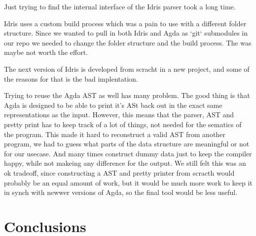 \documentclass[parskip=half]{scrartcl}
\begin{document}
Just trying to find the internal interface of the Idris parser took a long
time.

Idris uses a custom build process which was a pain to use with a different
folder structure. Since we wanted to pull in both Idris and Agda as `git`
submodules in our repo we needed to change the folder structure and the build
process. The was maybe not worth the effort.

The next version of Idris is developed from scracht in a new project, and some
of the reasons for that is the bad implentation. %

Trying to reuse the Agda AST as well has many problem. The good thing is that
Agda is designed to be able to print it's ASt back out in the exact same
representations as the input. However, this means that the parser, AST and
pretty print has to keep track of a lot of things, not needed for the sematics
of the program. This made it hard to reconstruct a valid AST from another
program, we had to guess what parts of the data structure are meaningful or not
for our usecase. And many times construct dummy data just to keep the compiler
happy, while not makeing any difference for the output. We still felt this was
an ok tradeoff, since constructing a AST and pretty printer from scracth would
probably be an equal amount of work, but it would be much more work to keep it
in synch with newwer versions of Agda, so the final tool would be less useful.



\section{Conclusions}




% 

\printbibliography{}
\end{document}
